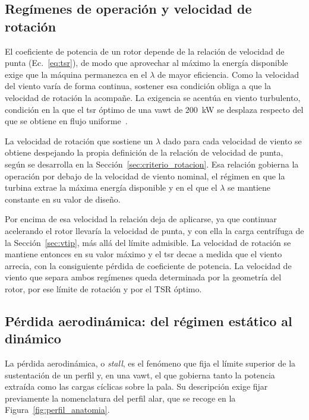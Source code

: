 \subsection{Regímenes de operación y velocidad de rotación}
\label{sec:regimenes_operacion}

El coeficiente de potencia de un rotor depende de la relación de velocidad de punta (Ec.~\ref{eq:tsr}), de modo que aprovechar al máximo la energía disponible exige que la máquina permanezca en el $\lambda$ de mayor eficiencia. Como la velocidad del viento varía de forma continua, sostener esa condición obliga a que la velocidad de rotación la acompañe. La exigencia se acentúa en viento turbulento, condición en la que el \gls{tsr} óptimo de una \gls{vawt} de $200$~kW se desplaza respecto del que se obtiene en flujo uniforme~\parencite{Mollerstrom2016}.

La velocidad de rotación que sostiene un $\lambda$ dado para cada velocidad de viento se obtiene despejando la propia definición de la relación de velocidad de punta, según se desarrolla en la Sección~\ref{sec:criterio_rotacion}. Esa relación gobierna la operación por debajo de la velocidad de viento nominal, el régimen en que la turbina extrae la máxima energía disponible y en el que el $\lambda$ se mantiene constante en su valor de diseño.

Por encima de esa velocidad la relación deja de aplicarse, ya que continuar acelerando el rotor llevaría la velocidad de punta, y con ella la carga centrífuga de la Sección~\ref{sec:vtip}, más allá del límite admisible. La velocidad de rotación se mantiene entonces en su valor máximo y el \gls{tsr} decae a medida que el viento arrecia, con la consiguiente pérdida de coeficiente de potencia. La velocidad de viento que separa ambos regímenes queda determinada por la geometría del rotor, por ese límite de rotación y por el TSR óptimo.

\subsection{Pérdida aerodinámica: del régimen estático al dinámico}
\label{sec:dynamicstall}

La pérdida aerodinámica, o \textit{stall}, es el fenómeno que fija el límite superior de la sustentación de un perfil y, en una \gls{vawt}, el que gobierna tanto la potencia extraída como las cargas cíclicas sobre la pala. Su descripción exige fijar previamente la nomenclatura del perfil alar, que se recoge en la Figura~\ref{fig:perfil_anatomia}.

